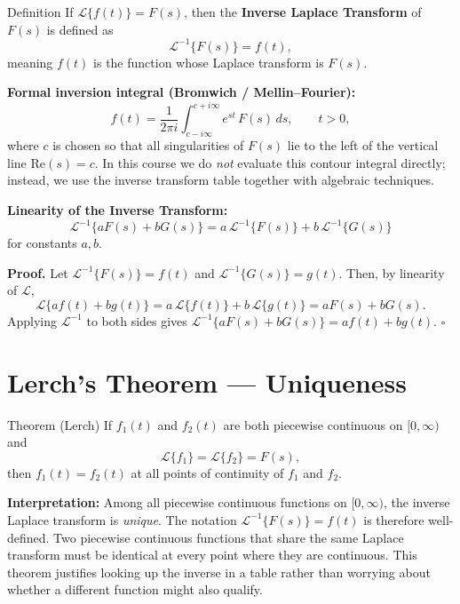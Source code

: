 \documentclass[12pt,a4paper]{article}
\begin{document}
\begin{infobox}{Definition}
If $\mathcal{L}\{f(t)\} = F(s)$, then the \textbf{Inverse Laplace Transform}
of $F(s)$ is defined as
\[
  \mathcal{L}^{-1}\{F(s)\} = f(t),
\]
meaning $f(t)$ is the function whose Laplace transform is $F(s)$.

\medskip
\textbf{Formal inversion integral (Bromwich / Mellin--Fourier):}
\[
  f(t) = \frac{1}{2\pi i} \int_{c-i\infty}^{c+i\infty} e^{st}\,F(s)\,ds,
  \qquad t > 0,
\]
where $c$ is chosen so that all singularities of $F(s)$ lie to the left of
the vertical line $\mathrm{Re}(s) = c$. In this course we do \emph{not}
evaluate this contour integral directly; instead, we use the inverse
transform table together with algebraic techniques.

\medskip
\textbf{Linearity of the Inverse Transform:}
\[
  \mathcal{L}^{-1}\{aF(s) + bG(s)\} = a\,\mathcal{L}^{-1}\{F(s)\} + b\,\mathcal{L}^{-1}\{G(s)\}
\]
for constants $a, b$.

\textbf{Proof.} Let $\mathcal{L}^{-1}\{F(s)\}=f(t)$ and
$\mathcal{L}^{-1}\{G(s)\}=g(t)$. Then, by linearity of $\mathcal{L}$,
\[
  \mathcal{L}\{af(t)+bg(t)\} = a\,\mathcal{L}\{f(t)\}+b\,\mathcal{L}\{g(t)\}
  = aF(s)+bG(s).
\]
Applying $\mathcal{L}^{-1}$ to both sides gives
$\mathcal{L}^{-1}\{aF(s)+bG(s)\} = af(t)+bg(t)$. \hfill$\square$
\end{infobox}

\section{Lerch's Theorem --- Uniqueness}

\begin{infobox}{Theorem (Lerch)}
If $f_1(t)$ and $f_2(t)$ are both piecewise continuous on $[0,\infty)$ and
\[
  \mathcal{L}\{f_1\} = \mathcal{L}\{f_2\} = F(s),
\]
then $f_1(t) = f_2(t)$ at all points of continuity of $f_1$ and $f_2$.

\medskip
\textbf{Interpretation:} Among all piecewise continuous functions on
$[0,\infty)$, the inverse Laplace transform is \emph{unique}. The notation
$\mathcal{L}^{-1}\{F(s)\} = f(t)$ is therefore well-defined. Two piecewise
continuous functions that share the same Laplace transform must be identical
at every point where they are continuous. This theorem justifies looking up
the inverse in a table rather than worrying about whether a different function
might also qualify.
\end{infobox}
\end{document}
